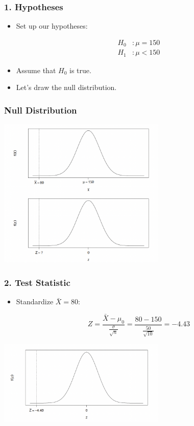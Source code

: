 \documentclass[12pt]{beamer}
\begin{document}
\begin{frame}
	\frametitle{1. Hypotheses}
	
	\begin{itemize}[label={\color{blue}$\blacktriangleright$}]
		\item Set up our hypotheses:
		
		\begin{align*}
			H_0 &: \mu = 150 \\
			H_1 &: \mu < 150
		\end{align*}
		
		\item Assume that $H_0$ is true.
		
		\item Let's draw the null distribution.
	\end{itemize}
	
\end{frame}
\begin{frame}
	\frametitle{Null Distribution}

		\centering
		\includegraphics[width=8cm]{null.png}

	
\end{frame}
\begin{frame}
	\frametitle{2. Test Statistic}
	
	\begin{itemize}[label={\color{blue}$\blacktriangleright$}]
		\item Standardize $\bar{X} = 80$:
		
		\begin{equation*}
			Z = \frac{\bar{X} - \mu_0}{\frac{\sigma}{\sqrt{n}}} = \frac{80 - 150}{\frac{50}{\sqrt{10}}} = -4.43
		\end{equation*}
	\end{itemize}
\vspace{0.7cm}
\centering
\includegraphics[width=8cm]{test.png}	

\end{frame}
\end{document}
